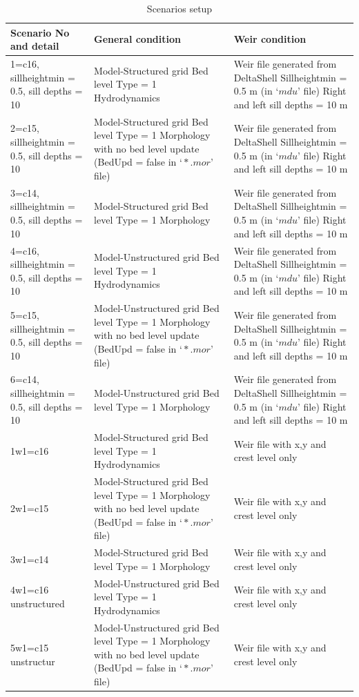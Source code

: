 \begin {table} [H]
\caption {Scenarios setup} \label{tab:title1}
\begin{center}
	\begin{tabular} { |p{5cm} | p{5cm} |p{5cm} | }
		\hline
		{\bf Scenario No and detail} & {\bf General condition} & {\bf Weir condition} \\ \hline
		1=c16, sillheightmin = 0.5, sill depths = 10 & Model-Structured grid
		Bed level Type = 1 Hydrodynamics & Weir file generated from DeltaShell
		Sillheightmin  = 0.5 m (in $‘mdu’$ file) Right and left sill depths = 10 m  \\ \hline
		2=c15, sillheightmin = 0.5, sill depths = 10 & Model-Structured grid
		Bed level Type = 1 	Morphology with no bed level update (BedUpd = false in $‘*.mor’$ file) 
		 & Weir file generated from DeltaShell  Sillheightmin  = 0.5 m (in $‘mdu’$ file)
		 Right and left sill depths = 10 m 		  \\ 		\hline
		  
		3=c14, sillheightmin = 0.5, sill depths = 10 & Model-Structured grid
		Bed level Type = 1
		Morphology 		
		 &Weir file generated from DeltaShell
		 Sillheightmin  = 0.5 m (in $‘mdu’$ file)
		 Right and left sill depths = 10 m
		  \\ 		\hline
		4=c16, sillheightmin = 0.5, sill depths = 10 & Model-Unstructured grid
		Bed level Type = 1
		Hydrodynamics
		 & Weir file generated from DeltaShell
		 Sillheightmin  = 0.5 m (in $‘mdu’$ file)
		 Right and left sill depths = 10 m
		  \\ 		\hline
		5=c15, sillheightmin = 0.5, sill depths = 10 & Model-Unstructured grid
		Bed level Type = 1
		Morphology with no bed level update (BedUpd = false in $‘*.mor’$ file)
		 & Weir file generated from DeltaShell
		 Sillheightmin  = 0.5 m (in $‘mdu’$ file)
		 Right and left sill depths = 10 m
		  \\ 		\hline
		6=c14, sillheightmin = 0.5, sill depths = 10 & Model-Unstructured grid
		Bed level Type = 1
		Morphology
		 & Weir file generated from DeltaShell
		 Sillheightmin  = 0.5 m (in $‘mdu’$ file)
		 Right and left sill depths = 10 m
		 		  \\ 		\hline
		1w1=c16 & Model-Structured grid
		Bed level Type = 1
		Hydrodynamics
		 & Weir file with x,y and crest level only  \\ 		\hline
		2w1=c15 & Model-Structured grid
		Bed level Type = 1
		Morphology with no bed level update (BedUpd = false in $‘*.mor’$ file) 
		 & Weir file with x,y and crest level only \\ 		\hline
		3w1=c14 & Model-Structured grid
		Bed level Type = 1
		Morphology
		 &Weir file with x,y and crest level only  \\ 		\hline
		4w1=c16 unstructured & Model-Unstructured grid
		Bed level Type = 1
		Hydrodynamics
		 & Weir file with x,y and crest level only \\ 		\hline
		5w1=c15 unstructur & Model-Unstructured grid
		Bed level Type = 1
		Morphology with no bed level update (BedUpd = false in $‘*.mor’$ file)
		 & Weir file with x,y and crest level only \\ 		\hline
	

\end{tabular}
\end{center}
\end{table}
